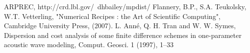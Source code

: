 \documentclass[amsmath,amssymb,floatfix]{revtex4}
\numberwithin{equation}{section}
\begin{document}
\begin{thebibliography}{3}


 ARPREC, http://crd.lbl.gov/~dhbailey/mpdist/
 Flannery, B.P., S.A. Teukolsky, W.T. Vetterling, "Numerical Recipes : the Art of Scientific Computing", Cambridge University Press, (2007).
 L. Anné, Q. H. Tran and W. W. Symes, Dispersion and cost analysis of some finite difference schemes in one-parameter acoustic wave modeling, Comput. Geosci. 1 (1997), 1–33



\end{thebibliography}
\end{document}
